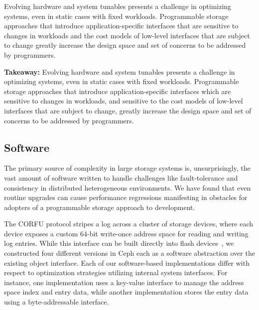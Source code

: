 Evolving hardware and system tunables presents a challenge in optimizing
systems, even in static cases with fixed workloads. Programmable storage
approaches that introduce application-specific interfaces that are sensitive
to changes in workloads and the cost models of low-level interfaces that are
subject to change  greatly increase the design space and set of concerns to be
addressed by programmers.

\textbf{Takeaway:} Evolving hardware and system tunables presents a challenge
in optimizing systems, even in static cases with fixed workloads. Programmable
storage approaches that introduce application-specific interfaces which are
sensitive to changes in workloads, and sensitive to the cost models of
low-level interfaces that are subject to change, greatly increase the design
space and set of concerns to be addressed by programmers.


\subsection{Software}

The primary source of complexity in large storage systems is, unsurprisingly,
the vast amount of software written to handle challenges like fault-tolerance
and consistency in distributed heterogeneous environments. We have found that
even routine upgrades can cause performance regressions manifesting in obstacles 
for adopters of a programmable storage approach to development.

The CORFU protocol stripes a log across a cluster of storage
devices, where each device exposes a custom 64-bit write-once address space for reading
and writing log entries. While this interface can be built directly into flash
devices~\cite{wei:systor13}, we constructed four different versions in Ceph
each as a software abstraction over the existing object interface.
Each of our software-based implementations differ with respect to optimization
strategies utilizing internal system interfaces. For instance, one
implementation uses a key-value interface to manage the address space index
and entry data, while another implementation stores the entry data using a
byte-addressable interface. 

